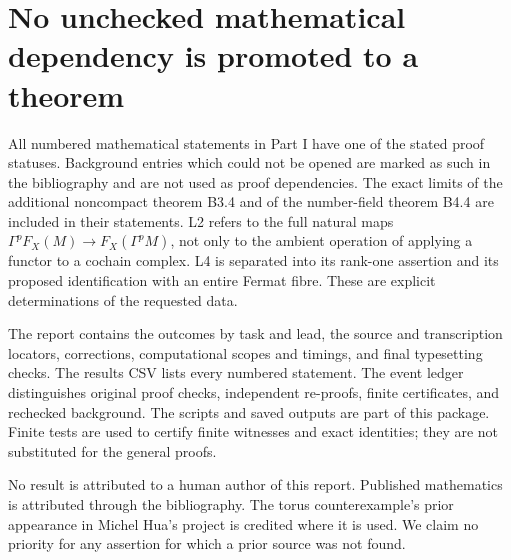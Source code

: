 \documentclass[11pt,a4paper]{article}
\begin{document}
\section{No unchecked mathematical dependency is promoted to a theorem}
All numbered mathematical statements in Part I have one of the stated
proof statuses. Background entries which could not be opened are
marked as such in the bibliography and are not used as proof
dependencies. The exact limits of the additional noncompact theorem
B3.4 and of the number-field theorem B4.4 are included in their
statements. L2 refers to the full natural maps
$\Gamma^pF_X(M)\to F_X(\Gamma^pM)$, not only to the ambient operation
of applying a functor to a cochain complex. L4 is separated into its
rank-one assertion and its proposed identification with an entire
Fermat fibre. These are explicit determinations of the requested data.

The report contains the outcomes by task and lead, the source and
transcription locators, corrections, computational scopes and timings,
and final typesetting checks. The results CSV lists every numbered
statement. The event ledger distinguishes original proof checks,
independent re-proofs, finite certificates, and rechecked background.
The scripts and saved outputs are part of this package. Finite tests
are used to certify finite witnesses and exact identities; they are
not substituted for the general proofs.

No result is attributed to a human author of this report. Published
mathematics is attributed through the bibliography. The torus
counterexample's prior appearance in Michel Hua's project is credited
where it is used. We claim no priority for any assertion for which a
prior source was not found.

\nocite{*}

\begingroup
\small

\endgroup
\end{document}
